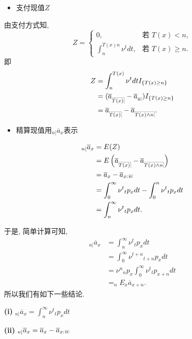 \documentclass[a4paper,openany, 10pt]{ctexbook}
\makeatletter
\newcommand{\hei}{\CJKfamily{hei}}      %
\def\z{\left}
\def\y{\right}
\DeclareRobustCommand{\annu}[1]{_{%
    \def\arraystretch{0}%
    \setlength\arraycolsep{1pt}%
    \setlength\arrayrulewidth{.2pt}%
    \begin{array}[b]{@{}c|}\hline
        \\[\arraycolsep]%
        \scriptstyle #1%
    \end{array}%
}}
\makeatother
\begin{document}
\begin{itemize}
    \item[{\bf\hei2.}] 支付现值$Z$
\end{itemize}
由支付方式知,
$$
    Z=
    \begin{cases}
        0,                           & \text{若 } T(x) < n ,   \\
         \int_n^{T(x)n} \nu^tdt, & \text{若 } T(x) \geq n.
    \end{cases}$$
即$$
    \begin{aligned}
    Z& =\int_n^{T(x)} \nu^tdtI_{\{T(x)\ge n\}}\\ &=(\overline{a}_{\annu{T(x)}}-\overline{a}_{\annu n})I_{\{T(x)\ge n\}}\\
    &=\overline{a}_{\annu {T(x)}} - \overline{a}_{\annu {T(x) \land n}}.
    \end{aligned}
$$
\begin{itemize}
    \item[{\bf\hei3.}] 精算现值用$_{n|}\overline{a}_{x}$表示
\end{itemize}
$$
    \begin{aligned}
        _{n|}\overline{a}_{x}& = E(Z) \\
        &= E\z(\overline{a}_{\annu {T(x)}} - \overline{a}_{\annu {T(x) \land n}}\y)\\
                   & = \overline a_{x}-\overline a_{x:}{}\annu n                                                \\
                   & = \int_0^{\infty}\nu^{t}{}_tp_xdt-\int_0^{n} \nu^{t}{}_tp_xdt\\
                   & =\int_n^{\infty}\nu^{t}{}_tp_xdt.
    \end{aligned}
$$

于是, 简单计算可知,
$$
    \begin{aligned}
        _{n|}\overline{a}_{x}& = \int_n^{\infty}\nu^{t}{}_tp_xdt \\
        &= \int_0^{\infty}\nu^{t+n}{}_{t+n}p_xdt \\
                   & =\nu^{n}{}_{n}p_x \int_0^{\infty}\nu^{t}{}_{t}p_{x+n}dt \\
                   & =_nE_x\overline{a}_{x+n}.
    \end{aligned}
$$
所以我们有如下一些结论.

{\rm\bf(i)} $_{n|}\overline{a}_{x}=\int_n^{\infty}\nu^{t}{}_tp_xdt$

{\rm\bf(ii)} $_{n|}\overline{a}_{x}=\overline{a}_{x}-\overline{a}_{x:}{}\annu{n}$
\end{document}

